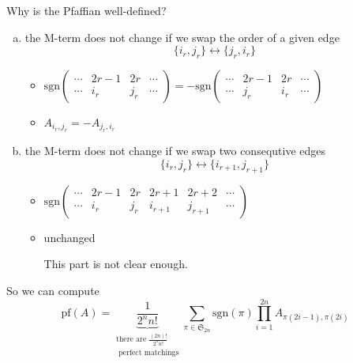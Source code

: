 \begin{remark}
Why is the Pfaffian well-defined?
\begin{enumerate}[(a)]
    \item the M-term does not change if we swap the order of a given edge
    \[ \{i_r,j_r\} \longleftrightarrow \{j_r,i_r\} \]
    \begin{itemize}
        \item \(\mathrm{sgn}\begin{pmatrix} \cdots&2r-1&2r&\cdots \\ \cdots&i_r&j_r&\cdots \end{pmatrix}=-\mathrm{sgn}\begin{pmatrix} \cdots&2r-1&2r&\cdots \\ \cdots&j_r&i_r&\cdots \end{pmatrix} \)
        \item \(A_{i_r,j_r}=-A_{j_r,i_r}\)
    \end{itemize}
    \item the M-term does not change if we swap two consequtive edges
    \[ \{i_r,j_r\} \longleftrightarrow \{i_{r+1},j_{r+1}\} \]
    \begin{itemize}
    \item \(\mathrm{sgn}\begin{pmatrix} \cdots&2r-1&2r&2r+1&2r+2&\cdots \\ \cdots&i_r&j_r&i_{r+1}&j_{r+1}&\cdots \end{pmatrix} \)
    \item unchanged
    \begin{question}
        This part is not clear enough.
    \end{question}
\end{itemize}
\end{enumerate}
So we can compute
\[ \mathrm{pf}(A)=\underbrace{\frac{1}{2^nn!}}_{\substack{\text{there are }\frac{(2n)!}{2^nn!}\\ \text{ perfect matchings}}}\sum_{\pi\in\mathfrak{S}_{2n}} \mathrm{sgn}(\pi)\prod_{i=1}^{2n}A_{\pi(2i-1),\pi(2i)} \]
\end{remark}
